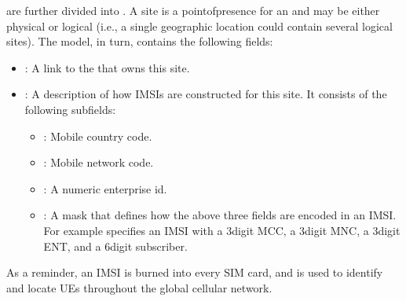 \documentclass[a4paper,11pt,english]{sphinxmanual}
\begin{document}
\sphinxAtStartPar
{} are further divided into . A site is a
point\sphinxhyphen{}of\sphinxhyphen{}presence for an  and may be either physical or
logical (i.e., a single geographic location could contain several
logical sites). The  model, in turn, contains the following
fields:
\begin{itemize}
\item {} 
\sphinxAtStartPar
{}: A link to the  that owns this site.

\item {} 
\sphinxAtStartPar
{}: A description of how IMSIs are constructed for
this site. It consists of the following sub\sphinxhyphen{}fields:
\begin{itemize}
\item {} 
\sphinxAtStartPar
{}: Mobile country code.

\item {} 
\sphinxAtStartPar
{}: Mobile network code.

\item {} 
\sphinxAtStartPar
{}: A numeric enterprise id.

\item {} 
\sphinxAtStartPar
{}: A mask that defines how the above three fields are
encoded in an IMSI. For example  specifies an
IMSI with a 3\sphinxhyphen{}digit MCC, a 3\sphinxhyphen{}digit MNC, a 3\sphinxhyphen{}digit ENT, and a 6\sphinxhyphen{}digit
subscriber.

\end{itemize}

\end{itemize}

\sphinxAtStartPar
As a reminder, an IMSI is burned into every SIM card, and is used to
identify and locate UEs throughout the global cellular network.
\end{document}
